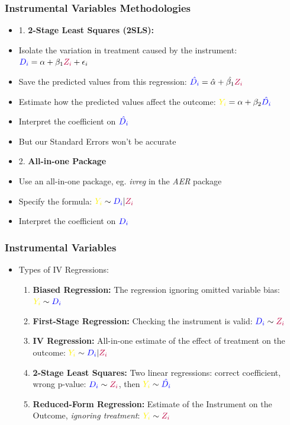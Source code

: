 \documentclass[xcolor=x11names,compress]{beamer}\usepackage[]{graphicx}\usepackage[]{color}
\renewcommand{\(}{\begin{columns}}
\renewcommand{\)}{\end{columns}}
\newcommand{\<}[1]{\begin{column}{#1}}
\renewcommand{\>}{\end{column}}
\begin{document}
\begin{frame}
\frametitle{Instrumental Variables Methodologies}
\begin{multicols}{2}
\begin{itemize}
\item 1. \textbf{2-Stage Least Squares (2SLS):}
\pause
\item Isolate the variation in treatment caused by the instrument: $\textcolor{blue}{D_i} = \alpha + \beta_1 \textcolor{purple}{Z_i} + \epsilon_i$
\pause
\item Save the predicted values from this regression: $\textcolor{blue}{\hat{D_i}} = \hat{\alpha} + \hat{\beta_1} \textcolor{purple}{Z_i}$
\pause
\item Estimate how the predicted values affect the outcome: $\textcolor{yellow}{Y_i} = \alpha + \beta_2 \textcolor{blue}{\hat{D_i}}$
\pause
\item Interpret the coefficient on $\textcolor{blue}{\hat{D_i}}$
\pause
\item But our Standard Errors won't be accurate
\end{itemize}
\columnbreak
\begin{itemize}
\item 2. \textbf{All-in-one Package} 
\pause
\item Use an all-in-one package, eg. \textit{ivreg} in the \textit{AER} package
\pause
\item Specify the formula: $\textcolor{yellow}{Y_i} \sim \textcolor{blue}{D_i} | \textcolor{purple}{Z_i}$
\pause
\item Interpret the coefficient on $\textcolor{blue}{D_i}$
\end{itemize}
\end{multicols}
\end{frame}

\begin{frame}
\frametitle{Instrumental Variables}
\begin{itemize}
\item Types of IV Regressions:
\pause
\begin{enumerate}
\item \textbf{Biased Regression:} The regression ignoring omitted variable bias: $\textcolor{yellow}{Y_i} \sim \textcolor{blue}{D_i}$
\pause
\item \textbf{First-Stage Regression:} Checking the instrument is valid: $\textcolor{blue}{D_i} \sim \textcolor{purple}{Z_i}$
\pause
\item \textbf{IV Regression:} All-in-one estimate of the effect of treatment on the outcome: $\textcolor{yellow}{Y_i} \sim \textcolor{blue}{D_i} | \textcolor{purple}{Z_i}$
\pause
\item \textbf{2-Stage Least Squares:} Two linear regressions: correct coefficient, wrong p-value: $\textcolor{blue}{D_i} \sim \textcolor{purple}{Z_i}$, then $\textcolor{yellow}{Y_i} \sim \textcolor{blue}{\hat{D_i}}$
\pause
\item \textbf{Reduced-Form Regression:} Estimate of the Instrument on the Outcome, \textit{ignoring treatment}: $\textcolor{yellow}{Y_i} \sim \textcolor{purple}{Z_i}$
\end{enumerate}
\end{itemize}
\end{frame}
\end{document}
